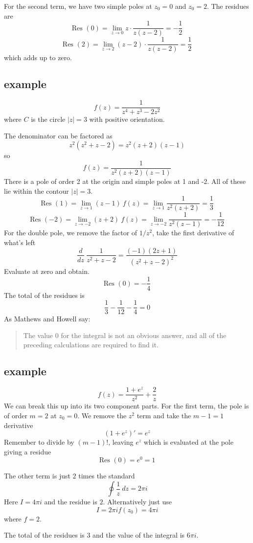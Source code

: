 \documentclass[11pt, oneside]{article}   	%
\begin{document}
For the second term, we have two simple poles at $z_0=0$ and $z_0=2$.  The residues are
\[ \text{Res } (0) = \lim_{z \rightarrow 0} z \cdot \frac{1}{z(z-2)} = - \frac{1}{2} \]
\[ \text{Res } (2) = \lim_{z \rightarrow 2} (z-2) \cdot \frac{1}{z(z-2)} = \frac{1}{2} \]
which adds up to zero.

\subsection*{example}
\[ f(z) = \frac{1}{z^4 + z^3 - 2z^2} \]
where $C$ is the circle $|z| = 3$ with positive orientation.

The denominator can be factored as
\[ z^2(z^2 + z - 2) = z^2(z + 2)(z - 1) \]
so
\[ f(z) = \frac{1}{z^2(z + 2)(z - 1)} \]
There is a pole of order 2 at the origin and simple poles at 1 and -2.  All of these lie within the contour $|z| = 3$.
\[ \text{Res }(1) = \lim_{z \rightarrow 1} (z-1) \ f(z) = \lim_{z \rightarrow 1} \frac{1}{z^2 (z + 2)} = \frac{1}{3} \]
\[ \text{Res }(-2) = \lim_{z \rightarrow -2} (z+2) \ f(z) = \lim_{z \rightarrow -2} \frac{1}{z^2 (z - 1)} = -\frac{1}{12} \]
For the double pole, we remove the factor of $1/z^2$, take the first derivative of what's left
\[ \frac{d}{dz} \ \frac{1}{z^2 + z - 2} = \frac{(-1)(2z + 1)}{(z^2 + z - 2)^2} \]
Evaluate at zero and obtain.
\[ \text{Res }(0) = - \frac{1}{4} \]
The total of the residues is
\[ \frac{1}{3} -\frac{1}{12} - \frac{1}{4} = 0 \]
As Mathews and Howell say:
\begin{quote}The value 0 for the integral is not an obvious answer, and all of the preceding calculations are required to find it.\end{quote}

\subsection*{example}
\[ f(z) = \frac{1 + e^z}{z^2} + \frac{2}{z} \]
We can break this up into its two component parts.  For the first term, the pole is of order $m = 2$ at $z_0 = 0$.  We remove the $z^2$ term and take the $m-1 = 1$ derivative
\[ (1 + e^z)' = e^z \]
Remember to divide by $(m-1)!$, leaving $e^z$ which is evaluated at the pole giving a residue
\[ \text{Res }(0) = e^0 = 1 \]

The other term is just $2$ times the standard
\[ \oint \frac{1}{z} \ dz = 2 \pi i \]
Here $I = 4 \pi i$ and the residue is $2$.  Alternatively just use
\[ I = 2 \pi i f(z_0) = 4 \pi i \]
where $f = 2$.

The total of the residues is $3$ and the value of the integral is $6 \pi i$.
\end{document}
